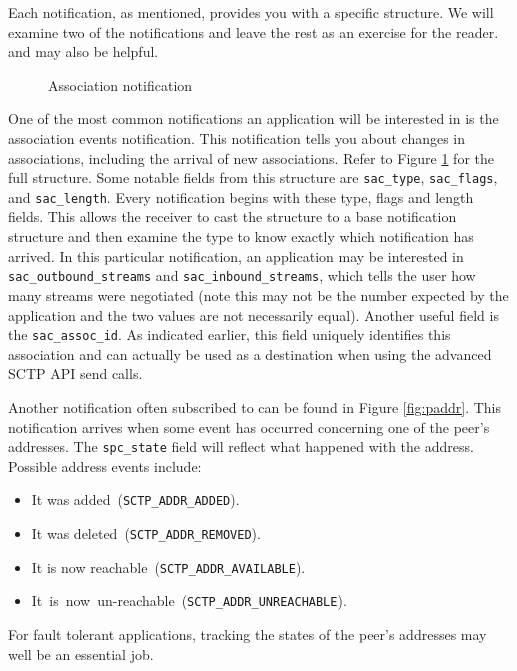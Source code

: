 \documentclass[conference]{IEEEtran}
\begin{document}
Each notification, as mentioned, provides you with a specific structure. 
We will examine two of the notifications and leave the rest
as an exercise for the reader. \cite{socketdraft} and \cite{stevensapi} may
also be helpful.

\begin{figure}

\caption{Association notification}
\label{fig:assocnotify}
\end{figure}

One of the most common notifications an application will be interested in is
the association events notification. This notification tells you about changes in
associations, including the arrival of new associations.  Refer to Figure \ref{fig:assocnotify} for the full structure.
Some notable fields from this structure are \texttt{sac\_type}, \texttt{sac\_flags},
and \texttt{sac\_length}. Every notification begins with these type, flags and length fields. 
This allows the receiver to cast the structure to a base notification structure and then
examine the type to know exactly which notification has arrived.
In this particular notification, an application may be interested in
\texttt{sac\_outbound\_streams} and \texttt{sac\_inbound\_streams}, which tells
the user how many streams were negotiated (note this may not be the number expected by
the application and the two values are not necessarily equal). Another useful field is the
\texttt{sac\_assoc\_id}.
As indicated earlier, this field uniquely identifies this association and can actually be used as a destination
when using the advanced SCTP API send calls.

Another notification often subscribed to can be found in Figure \ref{fig:paddr}.
This notification arrives when some event has occurred concerning one of the peer's
addresses. The \texttt{spc\_state} field will reflect what happened with the address.
Possible address events include:

\begin{itemize}
 \item  It was added~(\texttt{SCTP\_ADDR\_ADDED}).
 \item  It was deleted~(\texttt{SCTP\_ADDR\_REMOVED}).
 \item  It is now reachable~(\texttt{SCTP\_ADDR\_AVAILABLE}).
 \item  It~is~now~un-reachable~(\texttt{SCTP\_ADDR\_UNREACHABLE}).
\end{itemize}

For fault tolerant applications, tracking the states of the peer's addresses
may well be an essential job.
\end{document}
